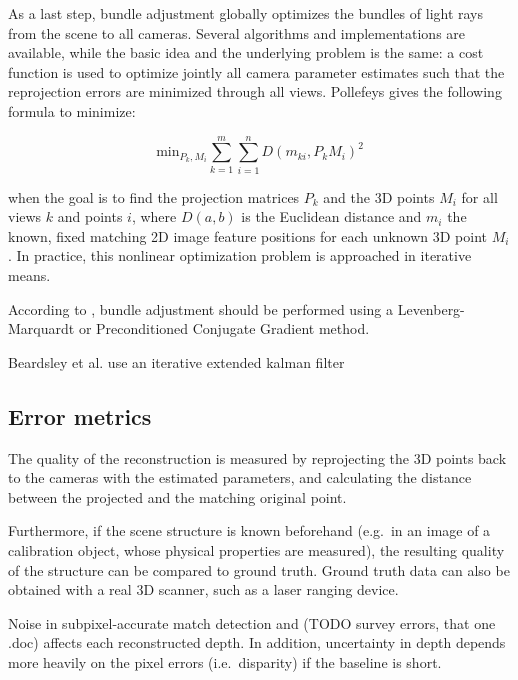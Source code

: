 As a last step, bundle adjustment globally optimizes the bundles of light rays from the scene to all cameras.
Several algorithms and implementations are available, while the basic idea and the underlying problem is the same:
a cost function is used to optimize jointly all camera parameter estimates such that the reprojection errors are minimized through all views.
Pollefeys \cite{tutorial} gives the following formula to minimize:

\begin{equation}
	\text{min}_{P_k, M_i} \sum_{k=1}^m \sum_{i=1}^n D(m_{ki}, P_k M_i)^2
\end{equation}

when the goal is to find the projection matrices $P_k$ and the 3D points $M_i$ for all views $k$ and points $i$, where $D(a,b)$ is the Euclidean distance and $m_i$ the known, fixed matching 2D image feature positions for each unknown 3D point $M_i$.
In practice, this nonlinear optimization problem is approached in iterative means.

According to \cite{wu2013towards}, bundle adjustment should be performed using a Levenberg-Marquardt or Preconditioned Conjugate Gradient method.

Beardsley et al. use an iterative extended kalman filter \cite{beardsley1997sequential}


\subsection{Error metrics} %

The quality of the reconstruction is measured by reprojecting the 3D points back to the cameras with the estimated parameters, and calculating the distance between the projected and the matching original point. \cite{hartley03multiview}

Furthermore, if the scene structure is known beforehand (e.g.\ in an image of a calibration object, whose physical properties are measured), the resulting quality of the structure can be compared to ground truth.
Ground truth data can also be obtained with a real 3D scanner, such as a laser ranging device. %

Noise in subpixel-accurate match detection and (TODO survey errors, that one .doc) affects each reconstructed depth.
In addition, uncertainty in depth depends more heavily on the pixel errors (i.e.\ disparity) if the baseline is short.



